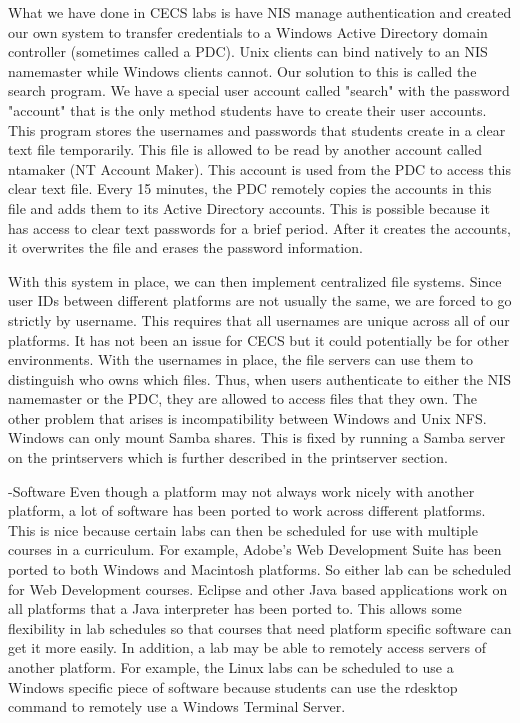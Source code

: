 What we have done in CECS labs is have NIS manage authentication and created our own system to transfer credentials to a Windows Active Directory domain controller (sometimes called a PDC).  Unix clients can bind natively to an NIS namemaster while Windows clients cannot.  Our solution to this is called the search program.  We have a special user account called "search" with the password "account" that is the only method students have to create their user accounts.  This program stores the usernames and passwords that students create in a clear text file temporarily.  This file is allowed to be read by another account called ntamaker (NT Account Maker).  This account is used from the PDC to access this clear text file.  Every 15 minutes, the PDC remotely copies the accounts in this file and adds them to its Active Directory accounts.  This is possible because it has access to clear text passwords for a brief period.  After it creates the accounts, it overwrites the file and erases the password information.

With this system in place, we can then implement centralized file systems.  Since user IDs between different platforms are not usually the same, we are forced to go strictly by username.  This requires that all usernames are unique across all of our platforms.  It has not been an issue for CECS but it could potentially be for other environments.  With the usernames in place, the file servers can use them to distinguish who owns which files.  Thus, when users authenticate to either the NIS namemaster or the PDC, they are allowed to access files that they own.  The other problem that arises is incompatibility between Windows and Unix NFS.  Windows can only mount Samba shares.  This is fixed by running a Samba server on the printservers which is further described in the printserver section.  

-Software
Even though a platform may not always work nicely with another platform, a lot of software has been ported to work across different platforms.  This is nice because certain labs can then be scheduled for use with multiple courses in a curriculum.  For example, Adobe's Web Development Suite has been ported to both Windows and Macintosh platforms.  So either lab can be scheduled for Web Development courses.  Eclipse and other Java based applications work on all platforms that a Java interpreter has been ported to.  This allows some flexibility in lab schedules so that courses that need platform specific software can get it more easily.  In addition, a lab may be able to remotely access servers of another platform.  For example, the Linux labs can be scheduled to use a Windows specific piece of software because students can use the rdesktop command to remotely use a Windows Terminal Server.  

